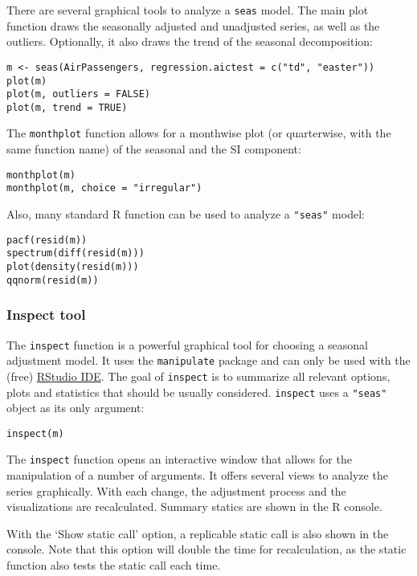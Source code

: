 There are several graphical tools to analyze a \texttt{seas} model. The
main plot function draws the seasonally adjusted and unadjusted series,
as well as the outliers. Optionally, it also draws the trend of the
seasonal decomposition:

\begin{verbatim}
m <- seas(AirPassengers, regression.aictest = c("td", "easter"))
plot(m)
plot(m, outliers = FALSE)
plot(m, trend = TRUE)
\end{verbatim}

The \texttt{monthplot} function allows for a monthwise plot (or
quarterwise, with the same function name) of the seasonal and the SI
component:

\begin{verbatim}
monthplot(m)
monthplot(m, choice = "irregular")
\end{verbatim}

Also, many standard R function can be used to analyze a \texttt{"seas"}
model:

\begin{verbatim}
pacf(resid(m))
spectrum(diff(resid(m)))
plot(density(resid(m)))
qqnorm(resid(m))
\end{verbatim}

\subsubsection{Inspect tool}\label{inspect-tool}

The \texttt{inspect} function is a powerful graphical tool for choosing
a seasonal adjustment model. It uses the \texttt{manipulate} package and
can only be used with the (free)
\href{http://www.rstudio.com/ide/}{RStudio IDE}. The goal of
\texttt{inspect} is to summarize all relevant options, plots and
statistics that should be usually considered. \texttt{inspect} uses a
\texttt{"seas"} object as its only argument:

\begin{verbatim}
inspect(m)
\end{verbatim}

The \texttt{inspect} function opens an interactive window that allows
for the manipulation of a number of arguments. It offers several views
to analyze the series graphically. With each change, the adjustment
process and the visualizations are recalculated. Summary statics are
shown in the R console.

With the `Show static call' option, a replicable static call is also
shown in the console. Note that this option will double the time for
recalculation, as the static function also tests the static call each
time.

